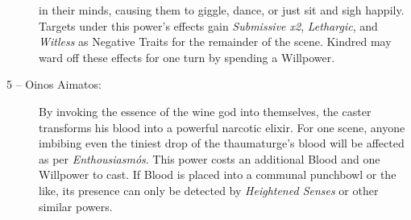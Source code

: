 \begin{description}
	in their minds, causing them to giggle, dance, or just sit and sigh happily.  Targets under this power's effects gain 
	\emph{Submissive x2}, \emph{Lethargic}, and \emph{Witless} as Negative Traits for the remainder of the scene.  Kindred may 
	ward off these effects for one turn by spending a Willpower.
	\item[5 -- Oinos Aimatos:]  By invoking the essence of the wine god into themselves, the caster transforms his blood into a 
	powerful narcotic elixir.  For one scene, anyone imbibing even the tiniest drop of the thaumaturge's blood will be affected 
	as per \emph{Enthousiasm\'{o}s}.  This power costs an additional Blood and one Willpower to cast.  If Blood is placed into a 
	communal punchbowl or the like, its presence can only be detected by \emph{Heightened Senses} or other similar powers.
\end{description}